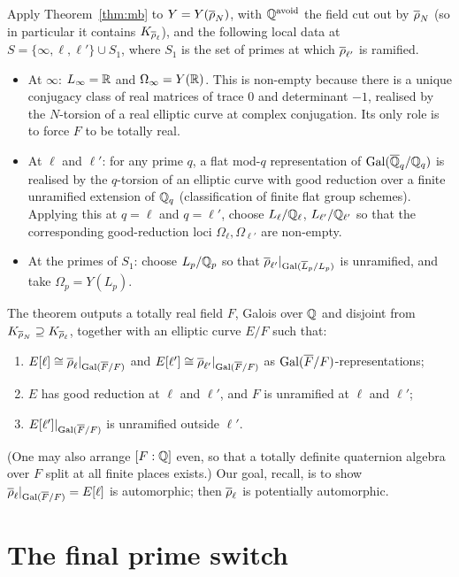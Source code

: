 \documentclass[11pt]{article}
\begin{document}
Apply Theorem~\ref{thm:mb} to $Y=Y(\overline{\rho}_N)$, with $\mathbb{Q}^{\mathrm{avoid}}$ the
field cut out by $\overline{\rho}_N$ (so in particular it contains $K_{\overline{\rho}_\ell}$),
and the following local data at $S=\{\infty,\ell,\ell'\}\cup S_1$, where $S_1$ is
the set of primes at which $\overline{\rho}_{\ell'}$ is ramified.

\begin{itemize}
\item At $\infty$: $L_\infty=\mathbb{R}$ and $\Omega_\infty=Y(\mathbb{R})$. This is non-empty
because there is a unique conjugacy class of real matrices of trace $0$ and
determinant $-1$, realised by the $N$-torsion of a real elliptic curve at
complex conjugation. Its only role is to force $F$ to be totally real.
\item At $\ell$ and $\ell'$: for any prime $q$, a flat mod-$q$ representation of
$\operatorname{Gal}(\overline{\mathbb{Q}}_q/\mathbb{Q}_q)$ is realised by the $q$-torsion of an elliptic curve with
good reduction over a finite unramified extension of $\mathbb{Q}_q$ (classification of
finite flat group schemes). Applying this at $q=\ell$ and $q=\ell'$, choose
$L_\ell/\mathbb{Q}_\ell$, $L_{\ell'}/\mathbb{Q}_{\ell'}$ so that the corresponding
good-reduction loci $\Omega_\ell,\Omega_{\ell'}$ are non-empty.
\item At the primes of $S_1$: choose $L_p/\mathbb{Q}_p$ so that
$\overline{\rho}_{\ell'}|_{\operatorname{Gal}(\overline L_p/L_p)}$ is unramified, and take
$\Omega_p=Y(L_p)$.
\end{itemize}

The theorem outputs a totally real field $F$, Galois over $\mathbb{Q}$ and disjoint from
$K_{\overline{\rho}_N}\supseteq K_{\overline{\rho}_\ell}$, together with an elliptic curve $E/F$
such that:
\begin{enumerate}
\item[(i)] $E[\ell]\cong\overline{\rho}_\ell|_{\operatorname{Gal}(\overline{F}/F)}$ and
$E[\ell']\cong\overline{\rho}_{\ell'}|_{\operatorname{Gal}(\overline{F}/F)}$ as $\operatorname{Gal}(\overline{F}/F)$-representations;
\item[(ii)] $E$ has good reduction at $\ell$ and $\ell'$, and $F$ is unramified
at $\ell$ and $\ell'$;
\item[(iii)] $E[\ell']|_{\operatorname{Gal}(\overline{F}/F)}$ is unramified outside $\ell'$.
\end{enumerate}
(One may also arrange $[F:\mathbb{Q}]$ even, so that a totally definite quaternion
algebra over $F$ split at all finite places exists.) Our goal, recall, is to
show $\overline{\rho}_\ell|_{\operatorname{Gal}(\overline{F}/F)}=E[\ell]$ is automorphic; then $\overline{\rho}_\ell$ is
potentially automorphic.

\section{The final prime switch}
\end{document}
